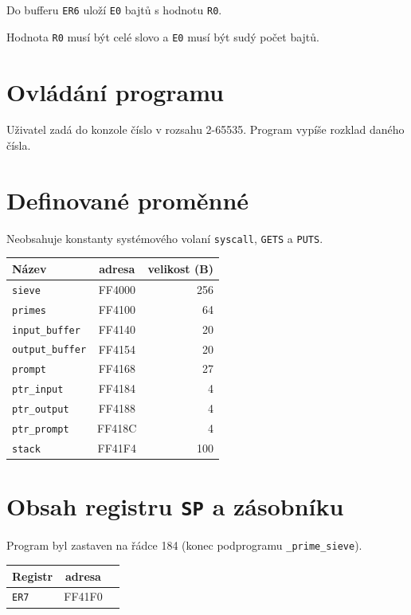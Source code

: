 \documentclass[12pt]{article}
\newcommand{\code}[1]{\mbox{\texttt{#1}}}
\begin{document}
Do bufferu \code{ER6} uloží \code{E0} bajtů s hodnotu \code{R0}.

Hodnota \code{R0} musí být celé slovo a \code{E0} musí být sudý počet bajtů.

\section{Ovládání programu}

Uživatel zadá do konzole číslo v rozsahu 2-65535. Program vypíše rozklad daného čísla.

\section{Definované proměnné}

Neobsahuje konstanty systémového volaní \code{syscall}, \code{GETS} a \code{PUTS}.

\begin{table}[H]
	\centering
	\begin{tabular}{|l|c|r|}
		\hline
		Název                 & adresa & velikost (B) \\ \hline
		\code{sieve}          & FF4000 & 256          \\ \hline
		\code{primes}         & FF4100 & 64           \\ \hline
		\code{input\_buffer}  & FF4140 & 20           \\ \hline
		\code{output\_buffer} & FF4154 & 20           \\ \hline
		\code{prompt}         & FF4168 & 27           \\ \hline
		\code{ptr\_input}     & FF4184 & 4            \\ \hline
		\code{ptr\_output}    & FF4188 & 4            \\ \hline
		\code{ptr\_prompt}    & FF418C & 4            \\ \hline
		\code{stack}          & FF41F4 & 100          \\ \hline
	\end{tabular}
\end{table}

\section{Obsah registru \code{SP} a zásobníku}

Program byl zastaven na řádce 184 (konec podprogramu \code{\_prime\_sieve}).


\begin{table}[H]
	\centering
	\begin{tabular}{|l|c|r|}
		\hline
		Registr    & adresa \\ \hline
		\code{ER7} & FF41F0 \\ \hline
	\end{tabular}
\end{table}
\end{document}
